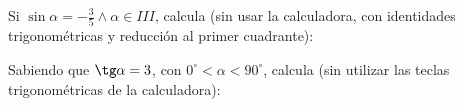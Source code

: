 \documentclass[addpoints,spanish, 12pt,a4paper]{exam}
\begin{document}
\begin{questions}
        
        \question Si $\sin\alpha=-\frac{3}{5}\land \alpha \in III$, calcula (sin usar la calculadora, con identidades trigonométricas y reducción al primer cuadrante):
        \begin{multicols}{1} 
        \end{multicols}
        
        
        \question Sabiendo que $\tg \alpha = 3$, con $0^\circ < \alpha < 90^\circ$, calcula (sin utilizar las teclas trigonométricas de la calculadora):
        

\end{questions}
\end{document}
